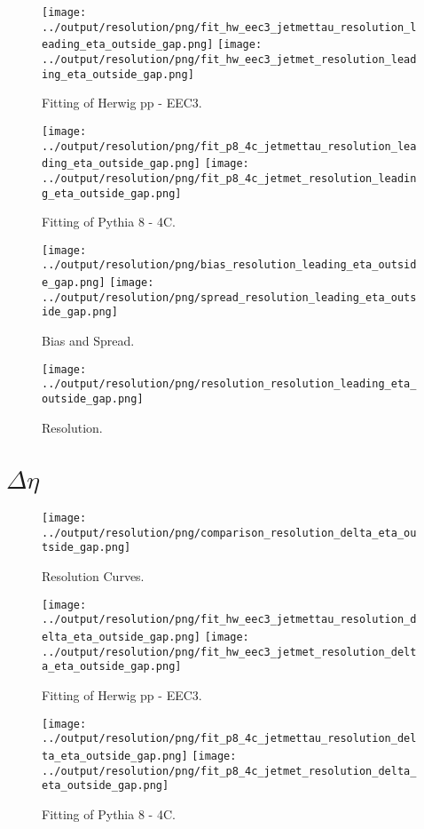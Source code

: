 \documentclass[11pt]{book}
\begin{document}
\begin{figure}[ht]
\centering
\texttt{[image: ../output/resolution/png/fit\_hw\_eec3\_jetmettau\_resolution\_leading\_eta\_outside\_gap.png]}
\texttt{[image: ../output/resolution/png/fit\_hw\_eec3\_jetmet\_resolution\_leading\_eta\_outside\_gap.png]}
\caption{Fitting of Herwig pp - EEC3.}
\end{figure}

\begin{figure}[ht]
\centering
\texttt{[image: ../output/resolution/png/fit\_p8\_4c\_jetmettau\_resolution\_leading\_eta\_outside\_gap.png]}
\texttt{[image: ../output/resolution/png/fit\_p8\_4c\_jetmet\_resolution\_leading\_eta\_outside\_gap.png]}
\caption{Fitting of Pythia 8 - 4C.}
\end{figure}

\begin{figure}[ht]
\centering
\texttt{[image: ../output/resolution/png/bias\_resolution\_leading\_eta\_outside\_gap.png]}
\texttt{[image: ../output/resolution/png/spread\_resolution\_leading\_eta\_outside\_gap.png]}
\caption{Bias and Spread.}
\end{figure}


\begin{figure}[ht]
\centering
\texttt{[image: ../output/resolution/png/resolution\_resolution\_leading\_eta\_outside\_gap.png]}
\caption{Resolution.}
\end{figure}
\clearpage


\section{$\Delta\eta$}

\begin{figure}[ht]
\centering
\texttt{[image: ../output/resolution/png/comparison\_resolution\_delta\_eta\_outside\_gap.png]}
\caption{Resolution Curves.}
\end{figure}


\begin{figure}[ht]
\centering
\texttt{[image: ../output/resolution/png/fit\_hw\_eec3\_jetmettau\_resolution\_delta\_eta\_outside\_gap.png]}
\texttt{[image: ../output/resolution/png/fit\_hw\_eec3\_jetmet\_resolution\_delta\_eta\_outside\_gap.png]}
\caption{Fitting of Herwig pp - EEC3.}
\end{figure}

\begin{figure}[ht]
\centering
\texttt{[image: ../output/resolution/png/fit\_p8\_4c\_jetmettau\_resolution\_delta\_eta\_outside\_gap.png]}
\texttt{[image: ../output/resolution/png/fit\_p8\_4c\_jetmet\_resolution\_delta\_eta\_outside\_gap.png]}
\caption{Fitting of Pythia 8 - 4C.}
\end{figure}
\end{document}
